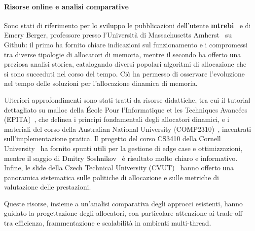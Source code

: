 \paragraph{Risorse online e analisi comparative}

Sono stati di riferimento per lo sviluppo le pubblicazioni dell’utente \textbf{mtrebi}~\cite{mtrebi} e di Emery Berger, professore presso l’Università di Massachusetts Amherst~\cite{emeryberger} su Github: il primo ha fornito chiare indicazioni sul funzionamento e i compromessi tra diverse tipologie di allocatori di memoria, mentre il secondo ha offerto una preziosa analisi storica, catalogando diversi popolari algoritmi di allocazione che si sono succeduti nel corso del tempo. Ciò ha permesso di osservare l’evoluzione nel tempo delle soluzioni per l’allocazione dinamica di memoria.

Ulteriori approfondimenti sono stati tratti da risorse didattiche, tra cui il tutorial dettagliato su malloc della École Pour l'Informatique et les Techniques Avancées (EPITA)~\cite{epita-malloc}, che delinea i principi fondamentali degli allocatori dinamici, e i materiali del corso della Australian National University (COMP2310)~\cite{anu-malloc}, incentrati sull’implementazione pratica. Il progetto del corso CS3410 della Cornell University~\cite{cornell-malloc} ha fornito spunti utili per la gestione di edge case e ottimizzazioni, mentre il saggio di Dmitry Soshnikov~\cite{soshnikov-allocator} è risultato molto chiaro e informativo. Infine, le slide della Czech Technical University (CVUT)~\cite{cvut-dynamic-mem} hanno offerto una panoramica sistematica sulle politiche di allocazione e sulle metriche di valutazione delle prestazioni.

Queste risorse, insieme a un’analisi comparativa degli approcci esistenti, hanno guidato la progettazione degli allocatori, con particolare attenzione ai trade-off tra efficienza, frammentazione e scalabilità in ambienti multi-thread.
